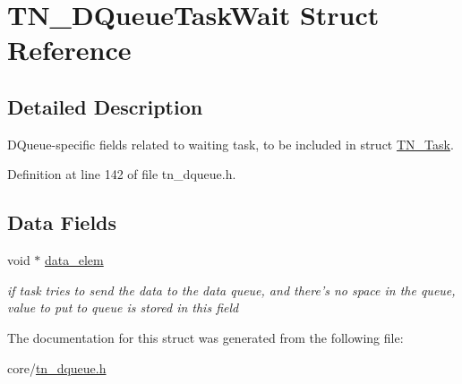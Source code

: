 \hypertarget{structTN__DQueueTaskWait}{\section{T\+N\+\_\+\+D\+Queue\+Task\+Wait Struct Reference}
\label{structTN__DQueueTaskWait}
}


\subsection{Detailed Description}
D\+Queue-\/specific fields related to waiting task, to be included in struct \hyperlink{structTN__Task}{T\+N\+\_\+\+Task}. 

Definition at line 142 of file tn\+\_\+dqueue.\+h.

\subsection*{Data Fields}
\begin{DoxyCompactItemize}
\item 
\hypertarget{structTN__DQueueTaskWait_aa3dd6acde9f906208285e539e7c1949d}{void $\ast$ \hyperlink{structTN__DQueueTaskWait_aa3dd6acde9f906208285e539e7c1949d}{data\+\_\+elem}}\label{structTN__DQueueTaskWait_aa3dd6acde9f906208285e539e7c1949d}

\begin{DoxyCompactList}\small\item\em if task tries to send the data to the data queue, and there's no space in the queue, value to put to queue is stored in this field \end{DoxyCompactList}\end{DoxyCompactItemize}


The documentation for this struct was generated from the following file\+:\begin{DoxyCompactItemize}
\item 
core/\hyperlink{tn__dqueue_8h}{tn\+\_\+dqueue.\+h}\end{DoxyCompactItemize}
